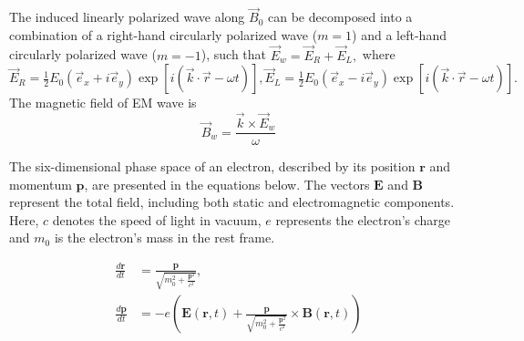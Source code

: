 \documentclass{cpbtex3}
\begin{document}
The induced linearly polarized wave along \( \vec{B}_0 \) can be decomposed into a combination of a right-hand circularly polarized wave (\( m = 1 \)) and a left-hand circularly polarized wave (\( m = -1 \)), such that
\(
\vec{E}_w = \vec{E}_R + \vec{E}_L,
\)
where
\(
\vec{E}_R = \frac{1}{2} E_0 (\vec{e}_x + i\vec{e}_y) \exp[i(\vec{k} \cdot \vec{r} - \omega t)],
\vec{E}_L = \frac{1}{2} E_0 (\vec{e}_x - i\vec{e}_y) \exp[i(\vec{k} \cdot \vec{r} - \omega t)].
\)
The magnetic field of EM wave is
\begin{equation}
\vec{B}_w = \frac{\vec{k} \times \vec{E}_w}{\omega}
\end{equation}

The six-dimensional phase space of an electron, described by its position $\bm{r}$ and momentum $\bm{p}$, are presented in the equations below. The vectors $\bm{E}$ and $\bm{B}$ represent the total field, including both static and electromagnetic components. Here, $c$ denotes the speed of light in vacuum, $e$ represents the electron's charge and $m_0$ is the electron's mass in the rest frame.

\begin{equation}
\begin{aligned}
\frac{d\bm{r}}{dt} &= \frac{\bm{p}}{\sqrt{m_0^2 + \frac{\bm{p}^2}{c^2}}}, \\
\frac{d\bm{p}}{dt} &= -e \left( \bm{E}(\bm{r}, t) + \frac{\bm{p}}{\sqrt{m_0^2 + \frac{\bm{p}^2}{c^2}}} \times \bm{B}(\bm{r}, t) \right)
\end{aligned}
\end{equation}
\end{document}
